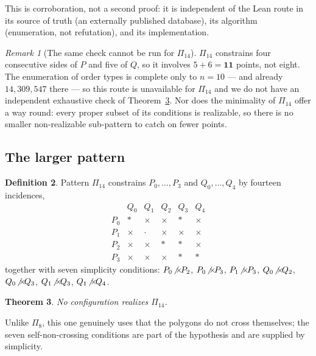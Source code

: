 \documentclass[11pt,a4paper]{article}
\theoremstyle{plain}
\newtheorem{theorem}{Theorem}[section]
\theoremstyle{definition}
\newtheorem{definition}[theorem]{Definition}
\theoremstyle{remark}
\newtheorem{remark}[theorem]{Remark}
\begin{document}
This is corroboration, not a second proof: it is independent of the Lean route
in its source of truth (an externally published database), its algorithm
(enumeration, not refutation), and its implementation.

\begin{remark}[The same check cannot be run for $\Pi_{14}$]\label{rem:no14}
$\Pi_{14}$ constrains four consecutive sides of $P$ and five of $Q$, so it
involves $5+6=\mathbf{11}$ points, not eight. The enumeration of order types is
complete only to $n=10$ --- and already $14{,}309{,}547$ there --- so this route
is unavailable for $\Pi_{14}$ and we do not have an independent exhaustive check
of Theorem~\ref{thm:pat14}. Nor does the minimality of $\Pi_{14}$ offer a way
round: every proper subset of its conditions is realizable, so there is no
smaller non-realizable sub-pattern to catch on fewer points.
\end{remark}

\subsection{The larger pattern}

\begin{definition}\label{def:pat14}
Pattern $\Pi_{14}$ constrains $P_0,\dots,P_3$ and $Q_0,\dots,Q_4$ by fourteen
incidences,
\[
\begin{array}{c|ccccc}
      & Q_0 & Q_1 & Q_2 & Q_3 & Q_4 \\ \hline
  P_0 & \ast & \times & \times & \ast & \times \\
  P_1 & \times & \cdot & \times & \times & \times \\
  P_2 & \times & \times & \ast & \ast & \times \\
  P_3 & \times & \times & \times & \ast & \ast
\end{array}
\]
together with seven simplicity conditions: $P_0\!\not\times\!P_2$,
$P_0\!\not\times\!P_3$, $P_1\!\not\times\!P_3$, $Q_0\!\not\times\!Q_2$,
$Q_0\!\not\times\!Q_3$, $Q_1\!\not\times\!Q_3$, $Q_1\!\not\times\!Q_4$.
\end{definition}

\begin{theorem}\label{thm:pat14}
No configuration realizes $\Pi_{14}$.
\end{theorem}

Unlike $\Pi_8$, this one genuinely uses that the polygons do not cross
themselves; the seven self-non-crossing conditions are part of the hypothesis
and are supplied by simplicity.
\end{document}
